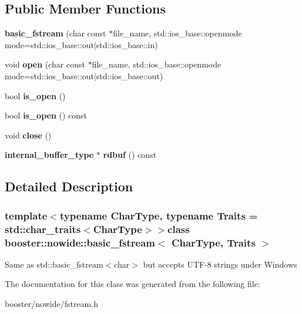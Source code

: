 \subsection*{Public Member Functions}
\begin{DoxyCompactItemize}
\item 
{\bfseries basic\-\_\-fstream} (char const $\ast$file\-\_\-name, std\-::ios\-\_\-base\-::openmode mode=std\-::ios\-\_\-base\-::out$\vert$std\-::ios\-\_\-base\-::in)\label{classbooster_1_1nowide_1_1basic__fstream_a19bf2f035f508e8912dd7ca2226aa3ac}

\item 
void {\bfseries open} (char const $\ast$file\-\_\-name, std\-::ios\-\_\-base\-::openmode mode=std\-::ios\-\_\-base\-::out$\vert$std\-::ios\-\_\-base\-::out)\label{classbooster_1_1nowide_1_1basic__fstream_a8bd6973e1d307904b913838db1601fe1}

\item 
bool {\bfseries is\-\_\-open} ()\label{classbooster_1_1nowide_1_1basic__fstream_aa935f6d90db9050d7d7d41ff92600495}

\item 
bool {\bfseries is\-\_\-open} () const \label{classbooster_1_1nowide_1_1basic__fstream_a51b8ed3cbf427146d8396c70a68726e8}

\item 
void {\bfseries close} ()\label{classbooster_1_1nowide_1_1basic__fstream_ad07239315e831d3be0d6468e6e1d964a}

\item 
{\bf internal\-\_\-buffer\-\_\-type} $\ast$ {\bfseries rdbuf} () const \label{classbooster_1_1nowide_1_1basic__fstream_ac60c9e9e38d4fbd030c30be89b5a1b62}

\end{DoxyCompactItemize}


\subsection{Detailed Description}
\subsubsection*{template$<$typename Char\-Type, typename Traits = std\-::char\-\_\-traits$<$\-Char\-Type$>$$>$class booster\-::nowide\-::basic\-\_\-fstream$<$ Char\-Type, Traits $>$}

Same as std\-::basic\-\_\-fstream$<$char$>$ but accepts U\-T\-F-\/8 strings under Windows 

The documentation for this class was generated from the following file\-:\begin{DoxyCompactItemize}
\item 
booster/nowide/fstream.\-h\end{DoxyCompactItemize}
